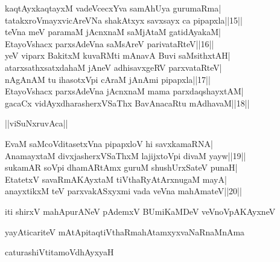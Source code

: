 \documentclass{article}
\begin{document}
kaqtAyxkaqtayxM vadeVcecxYva samAhUya gurumaRma|\\
tatakxroVmayxvicAreVNa shakAtxyx savxsayx ca pipapxla||15||\\
teVna meV paramaM jAcnxnaM saMjAtaM gatidAyakaM|\\
EtayoVshacx parxsAdeVna saMsAreV parivataRteV||16||\\
yeV viparx BakitxM kuvaRMti mAnavA Buvi saMsithxtAH|\\
atarxsathxsatxdahaM jAneV adhisavxgeRV parxvataRteV|\\
nAgAnAM tu ihasotxVpi cAraM jAnAmi pipapxla||17||\\
EtayoVshacx parxsAdeVna jAcnxnaM mama parxdaqshayxtAM|\\
gacaCx vidAyxdharasherxVSaThx BavAnacaRtu mAdhavaM||18||\\

\begin{center}
||viSuNxruvAca||
\end{center}

EvaM saMcoVditasetxVna pipapxloV hi savxkamaRNA|\\
AnamayxtaM divxjasherxVSaThxM lajijxtoVpi divaM yayw||19||\\
sukamAR soVpi dhamARtAmx guruM shushUrxSateV punaH|\\
EtatetxV savaRmAKAyxtaM tiVthaRyAtArxnugaM mayA|\\
anayxtikxM teV parxvakASxyxmi vada veVna mahAmateV||20||

\begin{center}
iti shirxV mahApurANeV pAdemxV BUmiKaMDeV veVnoVpAKAyxneV
\end{center}

\begin{center}
yayAticariteV mAtApitaqtiVthaRmahAtamxyxvaNaRnaMnAma
\end{center}

\begin{center}
caturashiVtitamoVdhAyxyaH
\end{center}
\end{document}
